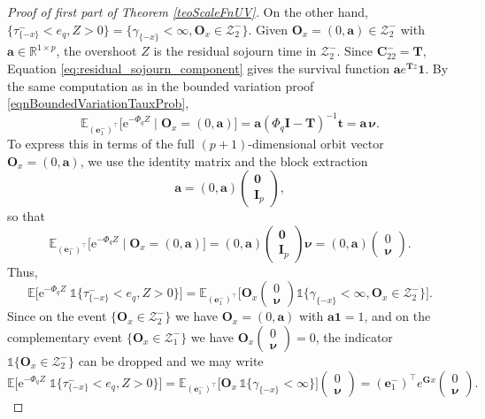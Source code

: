 \documentclass[10pt,a4paper]{amsart}
\newcommand{\e}{\mathrm{e}}
\begin{document}
\begin{proof}[Proof of first part of Theorem \ref{teoScaleFnUV}]
On the other hand, $\{\tau^-_{\{-x\}} < e_q, Z>0\} = \{\gamma_{\{-x\}}<\infty, \bm{O}_x\in \mathcal{Z}^-_2\}$. Given $\bm{O}_x = (0,\bm{a}) \in \mathcal{Z}_2^-$ with $\bm{a} \in \mathbb{R}^{1\times p}$, the overshoot $Z$ is the residual sojourn time in $\mathcal{Z}_2^-$. Since $\bm{C}_{22}^- = \bm{T}$, Equation \eqref{eq:residual_sojourn_component} gives the survival function $\bm{a}e^{\bm{T}z}\bm{1}$. By the same computation as in the bounded variation proof \eqref{eqnBoundedVariationTauxProb},
\[
\mathbb{E}_{(\bm{e}_1^-)^\intercal}\big[\e^{-\Phi_q Z} \mid \bm{O}_x = (0,\bm{a})\big] = \bm{a}(\Phi_q\bm{I}-\bm{T})^{-1}\bm{t} = \bm{a}\,\bm{\nu}.
\]
To express this in terms of the full $(p+1)$-dimensional orbit vector $\bm{O}_x = (0,\bm{a})$, we use the identity matrix and the block extraction
\[
\bm{a} = (0,\bm{a})\begin{pmatrix}\bm{0}\\\bm{I}_p\end{pmatrix},
\]
so that
\[
\mathbb{E}_{(\bm{e}_1^-)^\intercal}\big[\e^{-\Phi_q Z} \mid \bm{O}_x=(0,\bm{a})\big] = (0,\bm{a})\begin{pmatrix}\bm{0}\\\bm{I}_p\end{pmatrix}\bm{\nu} = (0,\bm{a})\begin{pmatrix}0\\\bm{\nu}\end{pmatrix}.
\]
Thus,
\[
\mathbb{E}\Big[\e^{-\Phi_q Z}\;\mathds{1}\big\{\tau^-_{\{-x\}} < e_q,Z>0\big\}\Big] = \mathbb{E}_{(\bm{e}_1^-)^\intercal}\Big[\bm{O}_x\begin{pmatrix}0\\\bm{\nu}\end{pmatrix}\mathds{1}\{\gamma_{\{-x\}} < \infty, \bm{O}_x\in\mathcal{Z}_2^-\}\Big].
\]
Since on the event $\{\bm{O}_x\in\mathcal{Z}_2^-\}$ we have $\bm{O}_x=(0,\bm{a})$ with $\bm{a}\bm{1}=1$, and on the complementary event $\{\bm{O}_x\in\mathcal{Z}_1^-\}$ we have $\bm{O}_x\begin{pmatrix}0\\\bm{\nu}\end{pmatrix}=0$, the indicator $\mathds{1}\{\bm{O}_x\in\mathcal{Z}_2^-\}$ can be dropped and we may write
\[
\mathbb{E}\Big[\e^{-\Phi_q Z}\;\mathds{1}\big\{\tau^-_{\{-x\}} < e_q,Z>0\big\}\Big] = \mathbb{E}_{(\bm{e}_1^-)^\intercal}\Big[\bm{O}_x\,\mathds{1}\{\gamma_{\{-x\}} < \infty\}\Big]\begin{pmatrix}0\\\bm{\nu}\end{pmatrix} = (\bm{e}_1^-)^\intercal e^{\bm{G}x}\begin{pmatrix}0\\\bm{\nu}\end{pmatrix}.
\]
\end{proof}
\end{document}

